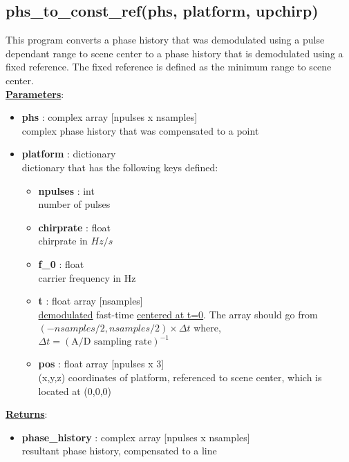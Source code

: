 \documentclass{article}
\newcommand{\defs}[2]{\textbf{{#1}} : {#2}}
\begin{document}
\newpage

\subsection{phs\_to\_const\_ref(phs, platform, upchirp)}
This program converts a phase history that was demodulated using a pulse dependant range to scene center to a phase history that is demodulated using a fixed reference.  The fixed reference is defined as the minimum range to scene center.\\

\noindent \underline{\textbf{Parameters}}:

\begin{itemize}
	\item \defs{phs}{complex array [npulses x nsamples]}\\
  	complex phase history that was compensated to a point
  	\item \defs{platform}{dictionary}\\
  	dictionary that has the following keys defined:
	\begin{itemize}
	    \item \defs{npulses}{int}\\
	    	number of pulses
	    \item \defs{chirprate}{float}\\
	    	chirprate in $Hz/s$
	    \item \defs{f\_0}{float}\\
	    	carrier frequency in Hz
	    \item \defs{t}{float array [nsamples]}\\
	    	\underline{demodulated} fast-time \underline{centered at t=0}.  The array should go from $(-nsamples/2, nsamples/2)\times\Delta t$ where, $\Delta t = (\mbox{A/D sampling rate})^{-1}$
	    \item \defs{pos}{float array [npulses x 3]}\\
	       	(x,y,z) coordinates of platform, referenced to scene center, which is located at (0,0,0)
	\end{itemize}
\end{itemize}

\noindent \underline{\textbf{Returns}}:
\begin{itemize}
	\item \defs{phase\_history}{complex array [npulses x nsamples]}\\
	resultant phase history, compensated to a line
\end{itemize}
\end{document}
